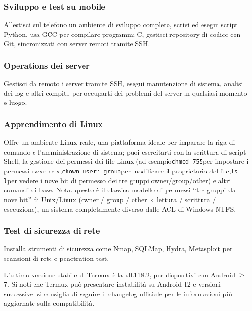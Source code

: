 \subsubsection*{Sviluppo e test su mobile}

Allestisci sul telefono un ambiente di sviluppo completo, scrivi ed esegui script Python, usa GCC per compilare programmi C, gestisci repository di codice con Git, sincronizzati con server remoti tramite SSH.

\subsubsection*{Operations dei server}

Gestisci da remoto i server tramite SSH, esegui manutenzione di sistema, analisi dei log e altri compiti, per occuparti dei problemi del server in qualsiasi momento e luogo.

\subsubsection*{Apprendimento di Linux}

Offre un ambiente Linux reale, una piattaforma ideale per imparare la riga di comando e l'amministrazione di sistema; puoi esercitarti con la scrittura di script Shell, la gestione dei permessi dei file Linux (ad esempio\texttt{chmod 755}per impostare i permessi rwxr-xr-x,\texttt{chown user: group}per modificare il proprietario del file,\texttt{ls -\allowbreak l}per vedere i nove bit di permesso dei tre gruppi owner/group/other) e altri comandi di base. Nota: questo è il classico modello di permessi “tre gruppi da nove bit” di Unix/Linux (owner / group / other × lettura / scrittura / esecuzione), un sistema completamente diverso dalle ACL di Windows NTFS.

\subsubsection*{Test di sicurezza di rete}

Installa strumenti di sicurezza come Nmap, SQLMap, Hydra, Metasploit per scansioni di rete e penetration test.


L'ultima versione stabile di Termux è la v0.118.2, per dispositivi con Android $\geq$ 7. Si noti che Termux può presentare instabilità su Android 12 e versioni successive; si consiglia di seguire il changelog ufficiale per le informazioni più aggiornate sulla compatibilità.

